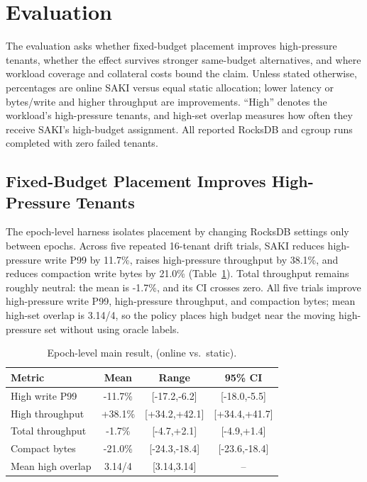 \section{Evaluation}
\label{sec:evaluation}

The evaluation asks whether fixed-budget placement improves high-pressure
tenants, whether the effect survives stronger same-budget alternatives, and
where workload coverage and collateral costs bound the claim. Unless stated
otherwise, percentages are online SAKI versus equal static allocation; lower
latency or bytes/write and higher throughput are improvements. ``High'' denotes
the workload's high-pressure tenants, and high-set overlap measures how often
they receive SAKI's high-budget assignment. All reported RocksDB and cgroup
runs completed with zero failed tenants.

\subsection{Fixed-Budget Placement Improves High-Pressure Tenants}

The epoch-level harness isolates placement by changing RocksDB settings only
between epochs. Across five repeated 16-tenant drift trials, SAKI reduces
high-pressure write P99 by 11.7\%, raises high-pressure throughput by
38.1\%, and reduces compaction write bytes by 21.0\%
(Table~\ref{tab:evaluation-epoch-main}). Total throughput remains roughly
neutral: the mean is -1.7\%, and its CI crosses zero. All five trials improve
high-pressure write P99, high-pressure throughput, and compaction bytes; mean
high-set overlap is 3.14/4, so the policy places high budget near the moving
high-pressure set without using oracle labels.

\begin{table}[!t]
  \centering
  \caption{Epoch-level main result, \epochdrift (online vs.\ static).}
  \label{tab:evaluation-epoch-main}
  \small
  \begin{tabular}{lccc}
    \toprule
    Metric & Mean & Range & 95\% CI \\
    \midrule
    High write P99 & -11.7\% & [-17.2,-6.2] & [-18.0,-5.5] \\
    High throughput & +38.1\% & [+34.2,+42.1] & [+34.4,+41.7] \\
    Total throughput & -1.7\% & [-4.7,+2.1] & [-4.9,+1.4] \\
    Compact bytes & -21.0\% & [-24.3,-18.4] & [-23.6,-18.4] \\
    Mean high overlap & 3.14/4 & [3.14,3.14] & -- \\
    \bottomrule
  \end{tabular}
\end{table}

